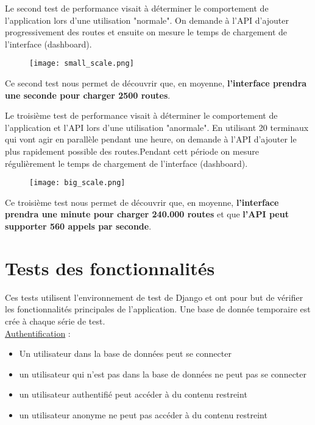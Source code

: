 \newpage
Le second test de performance visait à déterminer le comportement de l'application lors d'une utilisation "normale". \newline
On demande à l'API d'ajouter progressivement des routes et ensuite on mesure le temps de chargement de l'interface (dashboard).\newline

\begin{figure}[H]

    \texttt{[image: small\_scale.png]}

\end{figure}

Ce second test nous permet de découvrir que, en moyenne, \textbf{l'interface prendra une seconde pour charger 2500 routes}.

\newpage %
Le troisième test de performance visait à déterminer le comportement de l'application et l'API lors d'une utilisation "anormale".\newline
En utilisant 20 terminaux qui vont agir en parallèle pendant une heure, on demande à l'API d'ajouter le plus rapidement possible des routes.Pendant cett période on mesure régulièrement le temps de chargement de l'interface (dashboard).\newline



\begin{figure}[H]
    \texttt{[image: big\_scale.png]}
\end{figure}

Ce troisième test nous permet de découvrir que, en moyenne, \textbf{l'interface prendra une minute pour charger 240.000 routes} et que \textbf{l'API peut supporter 560 appels par seconde}.

\newpage




\section{Tests des fonctionnalités}

Ces tests utilisent l'environnement de test de Django et ont pour but de vérifier les fonctionnalités principales de l'application.
Une base de donnée temporaire est crée à chaque série de test.\\

\underline{Authentification} :
\begin{itemize}
\item Un utilisateur dans la base de données peut se connecter
\item un utilisateur qui n'est pas dans la base de données ne peut pas se connecter
\item un utilisateur authentifié peut accéder à du contenu restreint
\item un utilisateur anonyme ne peut pas accéder à du contenu restreint\newline
\end{itemize}


